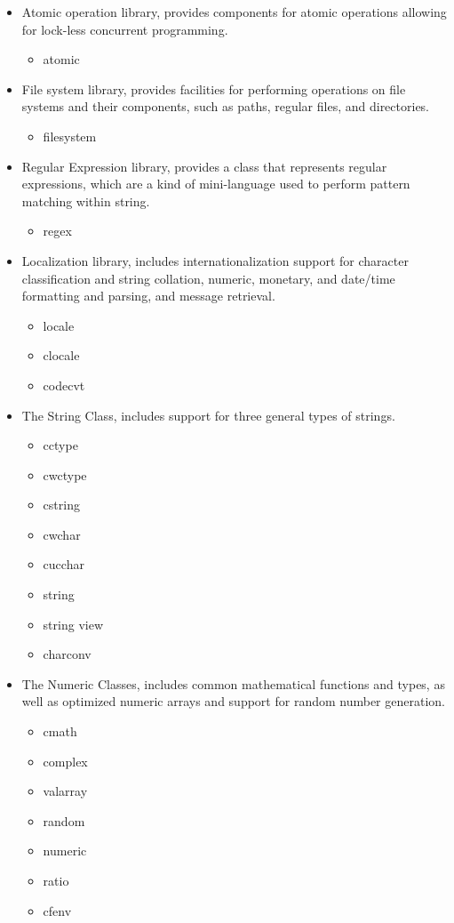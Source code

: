 \documentclass[12pt]{article}
\begin{document}
{\begin{enumerate}
\begin{itemize}
	\item Atomic operation library, provides components for atomic operations allowing for lock-less concurrent programming.\cite{cppreferenceLib}
		\begin{itemize}
		\item atomic
		\end{itemize}
	\item File system library, provides facilities for performing operations on file systems and their components, such as paths, regular files, and directories.\cite{cppreferenceLib}
		\begin{itemize}
		\item filesystem
		\end{itemize}
		
	\item Regular Expression library,  provides a class that represents regular expressions, which are a kind of mini-language used to perform pattern matching within string.\cite{cppreferenceLib}
		\begin{itemize}
		\item regex
		\end{itemize}
		
	\item Localization library, includes internationalization support for character classification and string collation, numeric, monetary, and date/time formatting and parsing, and message retrieval.\cite{cppreferenceLib}
		\begin{itemize}
		\item locale
		\item clocale
		\item codecvt
		\end{itemize}
		
	\item The String Class, includes support for three general types of strings.\cite{cppreferenceLib}
		\begin{itemize}
		\item cctype
		\item cwctype
		\item cstring
		\item cwchar
		\item cucchar
		\item string
		\item string view
		\item charconv
		\end{itemize}
		
	\item The Numeric Classes, includes common mathematical functions and types, as well as optimized numeric arrays and support for random number generation.\cite{cppreferenceLib}
		\begin{itemize}
		\item cmath
		\item complex
		\item valarray
		\item random
		\item numeric
		\item ratio
		\item cfenv
		\end{itemize}
		

\end{itemize}
\end{enumerate}}
\end{document}
